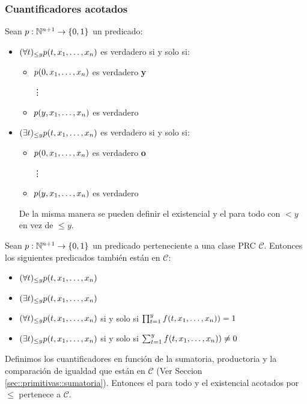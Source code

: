 \subsubsection{Cuantificadores acotados}
Sean $p:\mathbb{N}^{n+1}\to\{0,1\}$ un predicado:
\begin{itemize}
	\item[] $(\forall t)_{\leq y} p(t,x_1,\dots, x_{n})$ es verdadero si y solo si:
	\begin{itemize}
		\item $p(0, x_1,\dots, x_{n})$ es verdadero \textbf{y}
		
		\hspace*{1cm}\vdots
		
		\item $p(y, x_1,\dots, x_{n})$ es verdadero 
	\end{itemize}
\item[] $(\exists t)_{\leq y} p(t,x_1,\dots, x_{n})$ es verdadero si y solo si:
\begin{itemize}
	\item $p(0, x_1,\dots, x_{n})$ es verdadero \textbf{o}
	
	\hspace*{1cm}\vdots
	
	\item $p(y, x_1,\dots, x_{n})$ es verdadero 
\end{itemize}
De la misma manera se pueden definir el existencial y el para todo con $< y$ en vez de $\leq y$.
\end{itemize}
\begin{teorema}
 Sean $p:\mathbb{N}^{n+1}\to\{0,1\}$ un predicado perteneciente a una clase PRC $\mathcal{C}$. Entonces los siguientes predicados también están en $\mathcal{C}$:

\begin{itemize}
	\item[] $(\forall t)_{\leq y} p(t,x_1,\dots, x_{n})$ 
	\item[] $(\exists t)_{\leq y} p(t,x_1,\dots, x_{n})$
\end{itemize}
\end{teorema}

\begin{demo}
\begin{itemize}
	\item[] $(\forall t)_{\leq y} p(t,x_1,\dots, x_{n})$ si y solo si $\prod_{t=1}^{y} f(t,x_1,\dots, x_{n})) = 1$
	\item[] $(\exists t)_{\leq y} p(t,x_1,\dots, x_{n})$ si y solo si $\sum_{t=1}^{y} f(t,x_1,\dots, x_{n})) \neq 0$
\end{itemize}
Definimos los cuantificadores en función de la sumatoria, productoria y la comparación de igualdad que están en $\mathcal{C}$ (Ver Seccion \ref{sec::primitivas::sumatoria}). Entonces el para todo y el existencial acotados por $\leq$ pertenece a $\mathcal{C}$.
\end{demo}

